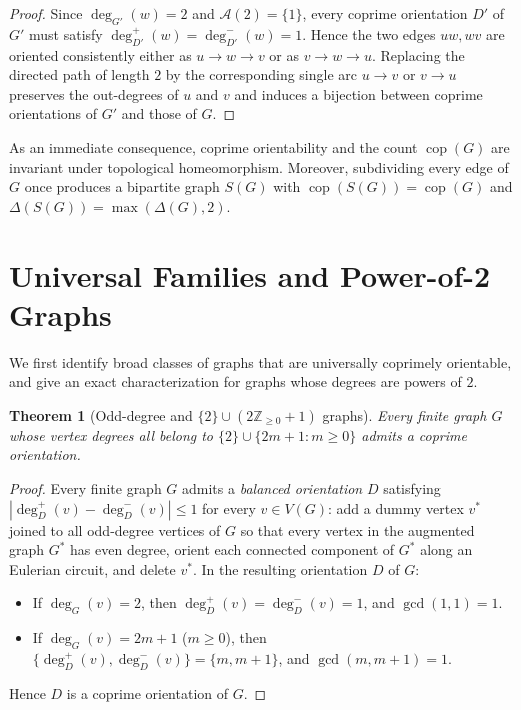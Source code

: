 \documentclass[11pt,a4paper]{article}
\newtheorem{theorem}{Theorem}[section]
\theoremstyle{definition}
\theoremstyle{remark}
\newcommand{\Z}{\mathbb{Z}}
\newcommand{\cop}{\operatorname{cop}}
\newcommand{\outdeg}{\deg^{+}}
\newcommand{\indeg}{\deg^{-}}
\newcommand{\Aset}{\mathcal{A}}
\begin{document}
\begin{proof}
Since $\deg_{G'}(w) = 2$ and $\Aset(2) = \{1\}$, every coprime orientation $D'$ of $G'$ must satisfy $\outdeg_{D'}(w) = \indeg_{D'}(w) = 1$. Hence the two edges $uw, wv$ are oriented consistently either as $u \to w \to v$ or as $v \to w \to u$. Replacing the directed path of length $2$ by the corresponding single arc $u \to v$ or $v \to u$ preserves the out-degrees of $u$ and $v$ and induces a bijection between coprime orientations of $G'$ and those of $G$.
\end{proof}

As an immediate consequence, coprime orientability and the count $\cop(G)$ are invariant under topological homeomorphism. Moreover, subdividing every edge of $G$ once produces a bipartite graph $S(G)$ with $\cop(S(G)) = \cop(G)$ and $\Delta(S(G)) = \max(\Delta(G), 2)$.

\section{Universal Families and Power-of-2 Graphs}

We first identify broad classes of graphs that are universally coprimely orientable, and give an exact characterization for graphs whose degrees are powers of $2$.

\begin{theorem}[Odd-degree and $\{2\} \cup (2\Z_{\ge 0} + 1)$ graphs]\label{thm:odd}
Every finite graph $G$ whose vertex degrees all belong to $\{2\} \cup \{2m + 1 : m \ge 0\}$ admits a coprime orientation.
\end{theorem}

\begin{proof}
Every finite graph $G$ admits a \emph{balanced orientation} $D$ satisfying $|\outdeg_D(v) - \indeg_D(v)| \le 1$ for every $v \in V(G)$: add a dummy vertex $v^*$ joined to all odd-degree vertices of $G$ so that every vertex in the augmented graph $G^*$ has even degree, orient each connected component of $G^*$ along an Eulerian circuit, and delete $v^*$. In the resulting orientation $D$ of $G$:
\begin{itemize}[leftmargin=2em,itemsep=1pt]
  \item If $\deg_G(v) = 2$, then $\outdeg_D(v) = \indeg_D(v) = 1$, and $\gcd(1, 1) = 1$.
  \item If $\deg_G(v) = 2m + 1$ ($m \ge 0$), then $\{\outdeg_D(v), \indeg_D(v)\} = \{m, m + 1\}$, and $\gcd(m, m + 1) = 1$.
\end{itemize}
Hence $D$ is a coprime orientation of $G$.
\end{proof}
\end{document}

